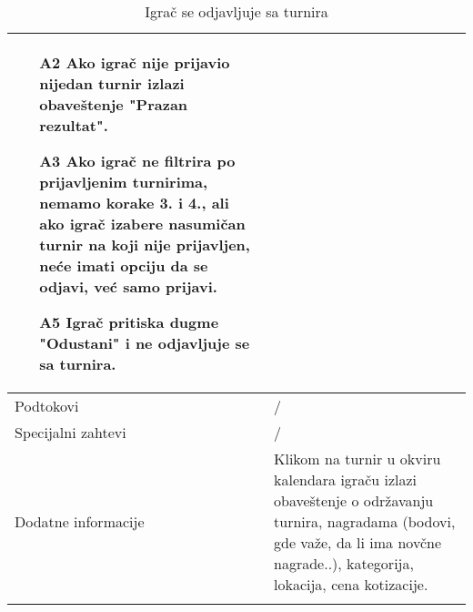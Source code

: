 \documentclass{article}
\begin{document}
\begin{longtable}{| p{} | p{} |}
                \begin{itemize}
                    \item[A2] Ako igrač nije prijavio nijedan turnir izlazi obaveštenje "Prazan rezultat".
                    \item[A3] Ako igrač ne filtrira po prijavljenim turnirima, nemamo korake 3. i 4., ali ako igrač izabere nasumičan turnir na koji nije prijavljen, neće imati opciju da se odjavi, već samo prijavi.
                    \item[A5] Igrač pritiska dugme "Odustani" i ne odjavljuje se sa turnira.
                \end{itemize}\\
            \hline
                Podtokovi & /\\
            \hline
                Specijalni zahtevi & /\\
            \hline
                Dodatne informacije & Klikom na turnir u okviru kalendara igraču izlazi obaveštenje o održavanju turnira, nagradama (bodovi, gde važe, da li ima novčne nagrade..), kategorija, lokacija, cena kotizacije. \\
            \hline
            \caption{Igrač se odjavljuje sa turnira} 
        \end{longtable}        
        
\end{document}
